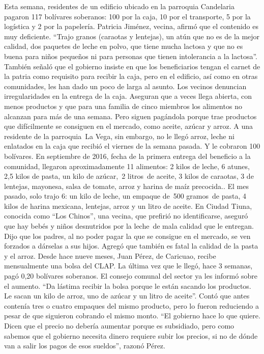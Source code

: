 \documentclass{article}%
\begin{document}
\newline%
%
Esta semana, residentes de un edificio ubicado en la parroquia Candelaria pagaron 117 bolívares soberanos: 100 por la caja, 10 por el transporte, 5 por la logística y 2 por la papelería. Patricia Jiménez, vecina, afirmó que el contenido es muy deficiente. “Trajo granos (caraotas y lentejas), un atún que no es de la mejor calidad, dos paquetes de leche en polvo, que tiene mucha lactosa y que no es buena para niños pequeños ni para personas que tienen intolerancia a la lactosa”.%
\newline%
%
También señaló que el gobierno insiste en que los beneficiarios tengan el carnet de la patria como requisito para recibir la caja, pero en el edificio, así como en otras comunidades, les han dado un poco de larga al asunto.%
\newline%
%
Los vecinos denuncian irregularidades en la entrega de la caja. Aseguran que a veces llega abierta, con menos productos y que para una familia de cinco miembros los alimentos no alcanzan para más de una semana. Pero siguen pagándola porque trae productos que difícilmente se consiguen en el mercado, como aceite, azúcar y arroz.%
\newline%
%
A una residente de la parroquia~La Vega, sin embargo, no le llegó arroz, leche ni enlatados en la caja que recibió el viernes de la semana pasada. Y le cobraron 100 bolívares.%
\newline%
%
En septiembre de 2016, fecha de la primera entrega del beneficio a la comunidad, llegaron aproximadamente 11 alimentos: 2 kilos de leche, 6 atunes, 2,5 kilos de pasta, un kilo de azúcar,~2 litros~de aceite, 3 kilos de caraotas, 3 de lentejas, mayonesa, salsa de tomate, arroz y harina de maíz precocida.. El mes pasado, solo trajo 6: un kilo de leche, un empaque de~500 gramos~de pasta, 4 kilos de harina mexicana, lentejas, arroz y un litro de aceite.%
\newline%
%
En Ciudad Tiuna, conocida como “Los Chinos”, una vecina, que prefirió no identificarse, aseguró que hay bebés y niños desnutridos por la leche~de mala calidad que le entregan. Dijo que los padres, al no poder pagar la que se consigue en el mercado, se ven forzados a dárselas a sus hijos. Agregó que también es fatal la calidad de la pasta y el arroz.%
\newline%
%
Desde hace nueve meses, Juan Pérez, de Caricuao, recibe mensualmente una bolsa del CLAP. La última vez que le llegó, hace 3 semanas, pagó 0,20 bolívares soberanos. El consejo comunal del sector ya les informó sobre el aumento. “Da lástima recibir la bolsa porque le están sacando los productos. Le sacan un kilo de arroz, uno de azúcar y un litro de aceite”.%
\newline%
%
Contó que antes contenía tres o cuatro empaques del mismo producto, pero lo fueron reduciendo a pesar de que siguieron cobrando el mismo monto. “El gobierno hace lo que quiere. Dicen que el precio no debería aumentar porque es subsidiado, pero como sabemos que el gobierno necesita dinero requiere subir los precios, si no de dónde van a salir los pagos de esos sueldos”, razonó Pérez.%
\newline%
%
\end{document}
